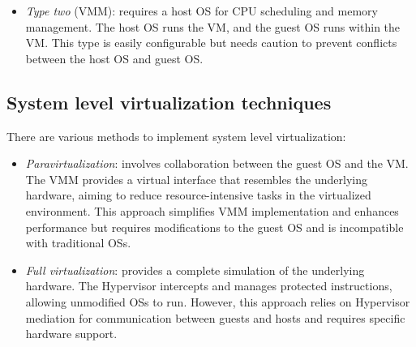 \begin{itemize}
    \item \textit{Type two} (VMM): requires a host OS for CPU scheduling and memory management. 
        The host OS runs the VM, and the guest OS runs within the VM.
        This type is easily configurable but needs caution to prevent conflicts between the host OS and guest OS.
\end{itemize}

\subsection{System level virtualization techniques}
There are various methods to implement system level virtualization:
\begin{itemize}
    \item \textit{Paravirtualization}: involves collaboration between the guest OS and the VM.
        The VMM provides a virtual interface that resembles the underlying hardware, aiming to reduce resource-intensive tasks in the virtualized environment.
        This approach simplifies VMM implementation and enhances performance but requires modifications to the guest OS and is incompatible with traditional OSs.
    \item \textit{Full virtualization}: provides a complete simulation of the underlying hardware.
        The Hypervisor intercepts and manages protected instructions, allowing unmodified OSs to run. 
        However, this approach relies on Hypervisor mediation for communication between guests and hosts and requires specific hardware support.
\end{itemize}

